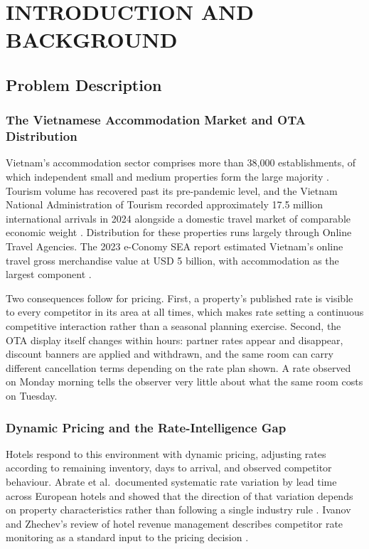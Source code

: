 \chapter{INTRODUCTION AND BACKGROUND}

\section{Problem Description}

\subsection{The Vietnamese Accommodation Market and OTA Distribution}

Vietnam's accommodation sector comprises more than 38,000 establishments, of which independent small and medium properties form the large majority \cite{vnat2024}. Tourism volume has recovered past its pre-pandemic level, and the Vietnam National Administration of Tourism recorded approximately 17.5 million international arrivals in 2024 alongside a domestic travel market of comparable economic weight \cite{vnat2024, gso2024}. Distribution for these properties runs largely through Online Travel Agencies. The 2023 e-Conomy SEA report estimated Vietnam's online travel gross merchandise value at USD 5 billion, with accommodation as the largest component \cite{googletemasek2023}.

Two consequences follow for pricing. First, a property's published rate is visible to every competitor in its area at all times, which makes rate setting a continuous competitive interaction rather than a seasonal planning exercise. Second, the OTA display itself changes within hours: partner rates appear and disappear, discount banners are applied and withdrawn, and the same room can carry different cancellation terms depending on the rate plan shown. A rate observed on Monday morning tells the observer very little about what the same room costs on Tuesday.

\subsection{Dynamic Pricing and the Rate-Intelligence Gap}

Hotels respond to this environment with dynamic pricing, adjusting rates according to remaining inventory, days to arrival, and observed competitor behaviour. Abrate et al.\ documented systematic rate variation by lead time across European hotels and showed that the direction of that variation depends on property characteristics rather than following a single industry rule \cite{abrate2012}. Ivanov and Zhechev's review of hotel revenue management describes competitor rate monitoring as a standard input to the pricing decision \cite{ivanov2014}.

